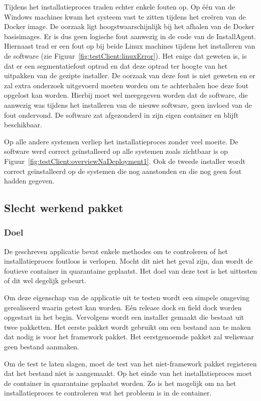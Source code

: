 Tijdens het installatieproces traden echter enkele fouten op.
Op één van de Windows machines kwam het systeem vast te zitten tijdens het creëren van de Docker image.
De oorzaak ligt hoogstwaarschijnlijk bij het afhalen van de Docker basisimages.
Er is dus geen logische fout aanwezig in de code van de InstallAgent.
Hiernaast trad er een fout op bij beide Linux machines tijdens het installeren van de software (zie Figuur~\ref{fig:testClient:linuxError}).
Het enige dat geweten is, is dat er een segmentatiefout optrad en dat deze optrad ter hoogte van het uitpakken van de gezipte installer.
De oorzaak van deze fout is niet geweten en er zal extra onderzoek uitgevoerd moeten worden om te achterhalen hoe deze fout opgelost kan worden.
Hierbij moet wel meegegeven worden dat de software, die aanwezig was tijdens het installeren van de nieuwe software, geen invloed van de fout ondervond.
De software zat afgezonderd in zijn eigen container en blijft beschikbaar.

Op alle andere systemen verliep het installatieproces zonder veel moeite.
De software werd correct geïnstalleerd op alle systemen zoals zichtbaar is op Figuur~\ref{fig:testClient:overviewNaDeployment1}.
Ook de tweede installer wordt correct geïnstalleerd op de systemen die nog aanstonden en die nog geen fout hadden gegeven.

\subsection{Slecht werkend pakket}
\subsubsection{Doel}
De geschreven applicatie bevat enkele methodes om te controleren of het installatieproces foutloos is verlopen.
Mocht dit niet het geval zijn, dan wordt de foutieve container in quarantaine geplaatst.
Het doel van deze test is het uittesten of dit wel degelijk gebeurt.

Om deze eigenschap van de applicatie uit te testen wordt een simpele omgeving gerealiseerd waarin getest kan worden.
Eén release dock en field dock worden opgestart in het begin.
Vervolgens wordt een installer gemaakt die bestaat uit twee pakketten.
Het eerste pakket wordt gebruikt om een bestand aan te maken dat nodig is voor het framework pakket.
Het eerstgenoemde pakket zal weliswaar geen bestand aanmaken.

Om de test te laten slagen, moet de test van het niet-framework pakket registeren dat het bestand niet is aangemaakt.
Op het einde van het installatieproces moet de container in quarantaine geplaatst worden.
Zo is het mogelijk om na het installatieproces te controleren wat het probleem is in de container.

